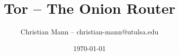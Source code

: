 \documentclass[12pt]{beamer}
\title[Introduction to Cryptography]{Tor -- The Onion Router}
\author{Christian Mann -- christian-mann@utulsa.edu}
\institute{University of Tulsa\\
Tulsa, Oklahoma 74104}
\date{\today}
\begin{document}
\lstset{
language=python,                %
showspaces=false,               %
showstringspaces=false,         %
showtabs=false,                 %
tabsize=4,	                %
}

\newtheorem{mydef}{Definition}


\begin{frame}
\titlepage
\end{frame}

\end{document}
